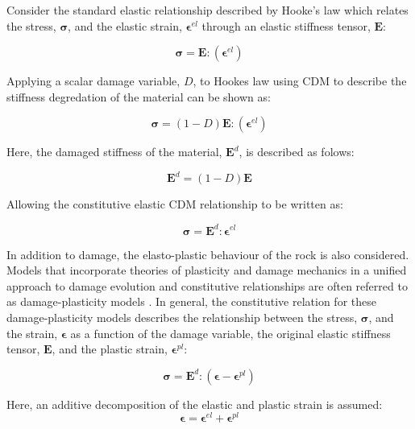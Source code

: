 Consider the standard elastic relationship described by Hooke's law which relates the stress, $\boldsymbol{\sigma}$, and the elastic strain, $\boldsymbol{\epsilon}^{el}$ through an elastic stiffness tensor, $\mathbf{E}$:

\begin{equation}
\boldsymbol{\sigma}=\mathbf{E}:\left(\boldsymbol{\epsilon}^{el}\right)
\label{eqn:const1}
\end{equation}

Applying a scalar damage variable, $D$, to Hookes law using CDM to describe the stiffness degredation of the material can be shown as:

\begin{equation}
\boldsymbol{\sigma}=\left(1-D\right)\mathbf{E}:\left(\boldsymbol{\epsilon}^{el}\right)
\label{eqn:const2}
\end{equation}

Here, the damaged stiffness of the material, $\mathbf{E}^d$, is described as folows:

\begin{equation}
\mathbf{E}^d=\left(1-D\right)\mathbf{E}
\label{eqn:const3}
\end{equation}

Allowing the constitutive elastic CDM relationship to be written as:

\begin{equation}
\boldsymbol{\sigma}=\mathbf{E}^d:\boldsymbol{\epsilon}^{el}
\label{eqn:const4}
\end{equation}

In addition to damage, the elasto-plastic behaviour of the rock is also considered. Models that incorporate theories of plasticity and damage mechanics in a unified approach to damage evolution and constitutive relationships are often referred to as damage-plasticity models \citep{zhang_continuum_2010}. In general, the constitutive relation for these damage-plasticity models describes the relationship between the stress, $\boldsymbol{\sigma}$, and the strain, $\boldsymbol{\epsilon}$ as a function of the damage variable, the original elastic stiffness tensor, $\mathbf{E}$, and the plastic strain, $\boldsymbol{\epsilon}^{pl}$: 

\begin{equation}
\boldsymbol{\sigma}=\mathbf{E}^d:\left(\boldsymbol{\epsilon}-\boldsymbol{\epsilon}^{pl}\right)
\label{eqn:const5}
\end{equation}

Here, an additive decomposition of the elastic and plastic strain is assumed:
\begin{equation}
\boldsymbol{\epsilon}=\boldsymbol{\epsilon}^{el}+\boldsymbol{\epsilon}^{pl}
\label{eqn:const6}
\end{equation}

